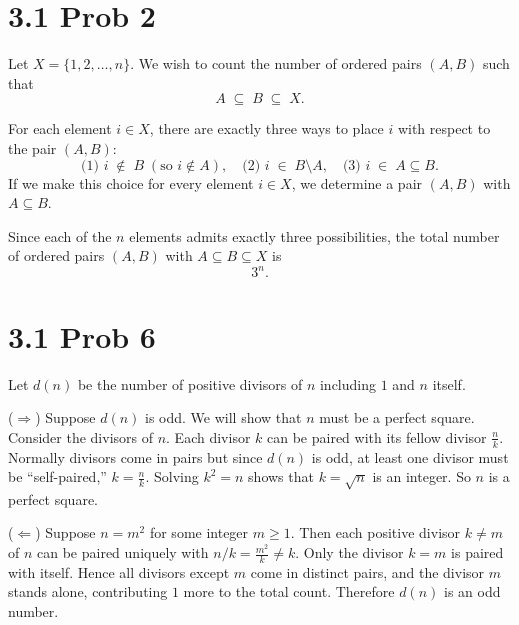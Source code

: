 \documentclass{report}
\begin{document}
\section*{3.1 Prob 2}


\begin{proofWithHibiscus}
  Let $X = \{1,2,\ldots,n\}$. We wish to count the number of ordered pairs $(A,B)$ such that
  \[
    A \;\subseteq\; B \;\subseteq\; X.
  \]

  For each element $i \in X$, there are exactly three ways to place $i$ with respect to the pair $(A,B)$:
  \[
    \text{(1) } i \;\notin\; B\;(\text{so } i \notin A), 
    \quad 
    \text{(2) } i \;\in\; B \setminus A,
    \quad
    \text{(3) } i \;\in\; A \subseteq B.
  \]
  If we make this choice for every element $i \in X$, we determine a pair $(A,B)$ with $A \subseteq B$. 

  \medskip

  Since each of the $n$ elements admits exactly three possibilities, the total number of ordered pairs $(A,B)$ with $A \subseteq B \subseteq X$ is
  \[
    3^n.
  \]
\end{proofWithHibiscus}


\section*{3.1 Prob 6}


\begin{proofWithHibiscus}
  Let $d(n)$ be the number of positive divisors of $n$ including $1$ and $n$ itself. 

  \bigskip

  (\(\Longrightarrow\))
  Suppose $d(n)$ is odd. We will show that $n$ must be a perfect square. 
  Consider the divisors of $n$. Each divisor $k$ can be paired with its fellow divisor $\tfrac{n}{k}$. 
  Normally divisors come in pairs but since $d(n)$ is odd, at least one divisor must be “self-paired,” 
  $k = \tfrac{n}{k}$. Solving $k^2 = n$ shows that $k = \sqrt{n}$ is an integer. 
  So $n$ is a perfect square.

  \bigskip

  (\(\Longleftarrow\))
  Suppose $n = m^2$ for some integer $m \ge 1$. Then each positive divisor $k \neq m$ 
  of $n$ can be paired uniquely with $n/k = \tfrac{m^2}{k} \neq k$. Only the divisor 
  $k = m$ is paired with itself. Hence all divisors except $m$ come in distinct pairs, 
  and the divisor $m$ stands alone, contributing $1$ more to the total count. 
  Therefore $d(n)$ is an odd number.

\end{proofWithHibiscus}
\end{document}
